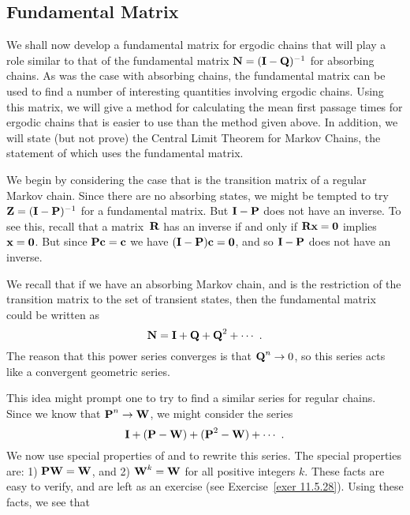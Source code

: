 \subsection*{Fundamental Matrix}
We shall now develop a fundamental matrix for ergodic chains that will play a
role
similar to that of the fundamental matrix ${\mbox{\bf N}\/} = ({\mbox{\bf I}\/} - {\mbox{\bf Q}\/})^{-1}$
for absorbing chains.  As was the case with absorbing chains, the fundamental
matrix
can be used to find a number of interesting quantities involving ergodic
chains.
Using this matrix, we will give a method for calculating
the mean first passage times for ergodic chains that is easier to use than the
method
given above.  In addition, we will state (but not prove) the Central Limit
Theorem for
Markov Chains, the statement of which uses the fundamental matrix.  
\par
We begin by considering the case that  is the transition matrix of a
regular 
Markov chain.  Since there are no absorbing states, we might be tempted to try 
${\mbox{\bf Z}\/} = ({\mbox{\bf I}\/} - {\mbox{\bf P}\/})^{-1}$ for a fundamental matrix.  But ${\mbox{\bf I}\/} - {\mbox{\bf P}\/}$
does not  have an inverse.  To see this, recall that a matrix~${\mbox{\bf R}\/}$ has an
inverse if and
only if ${\mbox{\bf R}\/} {\mbox{\bf x}\/} = {\mbox{\bf0}\/}$ implies ${\mbox{\bf x}\/} = {\mbox{\bf0}\/}$.  But
since ${\mbox{\bf P}\/}
{\mbox{\bf c}\/} = {\mbox{\bf c}\/}$ we have $({\mbox{\bf I}\/} - {\mbox{\bf P}\/}){\mbox{\bf c}\/} = {\mbox{\bf0}\/}$, and so
${\mbox{\bf I}\/} -
{\mbox{\bf P}\/}$ does not have an inverse.  
\par
We recall that if we have an absorbing Markov chain, and  is the
restriction of the transition matrix to the set of transient states, then the
fundamental
matrix  could be written as
$${\mbox{\bf N}\/} = {\mbox{\bf I}\/} + {\mbox{\bf Q}\/} + {\mbox{\bf Q}\/}^2 + \cdots\ .$$
The reason that this power series converges is that ${\mbox{\bf Q}\/}^n \rightarrow 0$,
so this series
acts like a convergent geometric series.
\par
This idea might prompt one to try to find a similar series for regular chains. 
Since we
know that ${\mbox{\bf P}\/}^n \rightarrow {\mbox{\bf W}\/}$, we might consider the series
\begin{equation}
{\mbox{\bf I}\/} + ({\mbox{\bf P}\/} -{\mbox{\bf W}\/}) + ({\mbox{\bf P}\/}^2 - {\mbox{\bf W}\/}) + \cdots\ .\label{eq
11.5.8}
\end{equation}
We now use special properties of  and  to rewrite this series. 
The special
properties are:  1) ${\mbox{\bf P}\/}{\mbox{\bf W}\/} = {\mbox{\bf W}\/}$, and 2) ${\mbox{\bf W}\/}^k = {\mbox{\bf W}\/}$ for all 
positive integers $k$.  These facts are easy to verify, and are left as an
exercise (see
Exercise~\ref{exer 11.5.28}).  Using these facts, we see that
